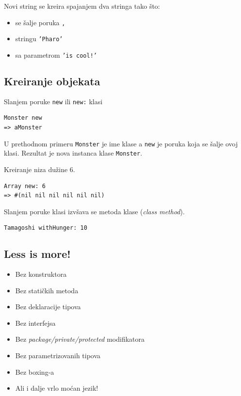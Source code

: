 \documentclass[presentation]{beamer}
\begin{document}
Novi string se kreira spajanjem dva stringa tako što:
\begin{itemize}
\item se šalje poruka \texttt{,}
\item stringu \texttt{'Pharo'}
\item sa parametrom \texttt{'is cool!'}
\end{itemize}

\subsection{Kreiranje objekata}
\label{sec:orgfb00acb}

Slanjem poruke \texttt{new} ili \texttt{new:} klasi

\begin{verbatim}
Monster new
=> aMonster
\end{verbatim}

U prethodnom primeru \texttt{Monster} je ime klase a \texttt{new} je poruka koja se šalje ovoj
klasi. Rezultat je nova instanca klase \texttt{Monster}.

Kreiranje niza dužine 6.

\begin{verbatim}
Array new: 6
=> #(nil nil nil nil nil nil)
\end{verbatim}

Slanjem poruke klasi izvšava se metoda klase (\emph{class method}).

\begin{verbatim}
Tamagoshi withHunger: 10
\end{verbatim}

\subsection{Less is more!}
\label{sec:org1b5941b}

\begin{itemize}
\item Bez konstruktora
\item Bez statičkih metoda
\item Bez deklaracije tipova
\item Bez interfejsa
\item Bez \emph{package/private/protected} modifikatora
\item Bez parametrizovanih tipova
\item Bez boxing-a
\item Ali i dalje vrlo moćan jezik!
\end{itemize}
\end{document}
